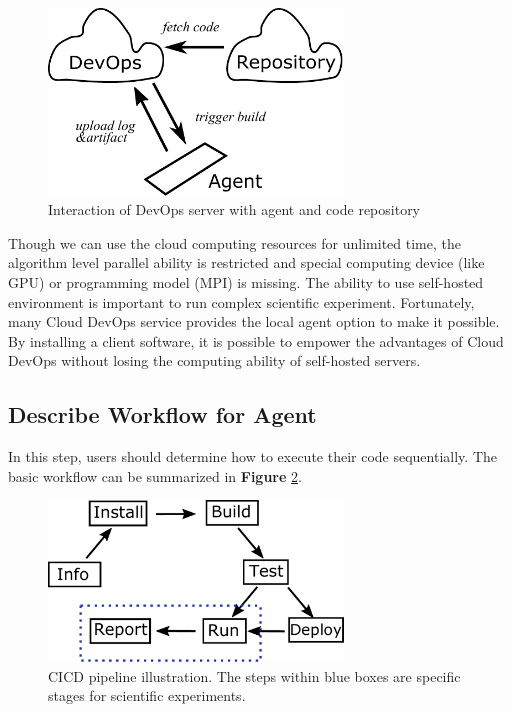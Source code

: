 \documentclass[10pt, conference, compsocconf]{IEEEtran}
\begin{document}
\begin{figure}[!ht]
\includegraphics[width=18.5pc]{principal.pdf}
\caption{Interaction of DevOps server with agent and code repository}\label{fig:principal}
\end{figure}

Though we can use the cloud computing resources for unlimited time, the algorithm level parallel ability is restricted and special computing device (like GPU) or programming model (MPI) is missing. The ability to use self-hosted environment is important to run complex scientific experiment. Fortunately, many Cloud DevOps service provides the local agent option to make it possible. By installing a client software, it is possible to empower the advantages of Cloud DevOps without losing the computing ability of self-hosted servers. 
\subsection{Describe Workflow for Agent}
In this step, users should determine how to execute their code sequentially. The basic workflow can be summarized in \textbf{Figure} \ref{fig:cicdworkflow}.

\begin{figure}[!ht]
\includegraphics[width=18.5pc]{workflow.pdf}
\caption{CICD pipeline illustration. The steps within blue boxes are specific stages for scientific experiments. }\label{fig:cicdworkflow}
\end{figure}
\end{document}
